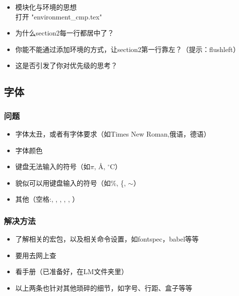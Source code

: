     
	\begin{frame}[fragile]
		\begin{itemize}
			\item 模块化与环境的思想\\
			打开 "environment\_cmp.tex"
			\item 为什么section2每一行都居中了？
			\item 你能不能通过添加环境的方式，让section2第一行靠左？（提示：flushleft）
			\item 这是否引发了你对优先级的思考？
		\end{itemize}
	\end{frame}
	
	
\subsection{字体}
    \begin{frame}
        \frametitle{问题}
        \begin{itemize}
            \item 字体太丑，或者有字体要求（如Times New Roman,俄语，德语）
            \item 字体颜色
            \item 键盘无法输入的符号（如$\pi$, \AA, $^{\circ}$C）
            \item 貌似可以用键盘输入的符号（如\%, \{, $\sim$）
            \item 其他（空格:\fbox{\$\qquad\$}, \fbox{\$\quad\$}, \fbox{\$\ \$}, \fbox{\$\;\$}, \fbox{\$~\$} \fbox{\$\,\$}, \fbox{\$\!\$}）
        \end{itemize}
    \end{frame}

    \begin{frame}
        \frametitle{解决方法}
        \begin{itemize}
            \item 了解相关的宏包，以及相关命令设置，如fontspec，babel等等
            \item 要用去网上查
            \item 看手册（已准备好，在LM文件夹里）
            \item 以上两条也针对其他琐碎的细节，如字号、行距、盒子等等
        \end{itemize}
    \end{frame}